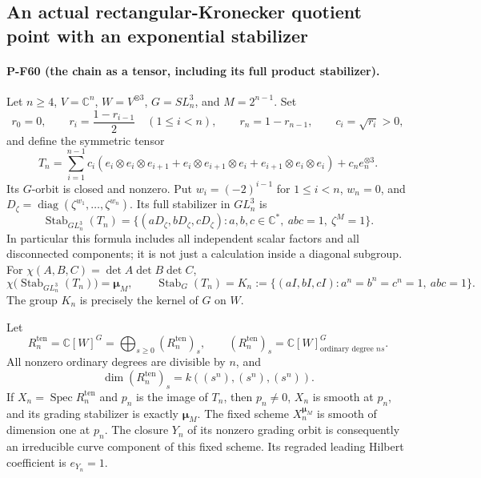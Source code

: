 \subsection{An actual rectangular-Kronecker quotient point with an exponential stabilizer}
\label{sec:tensor-chain-point}

\paragraph{P-F60 (the chain as a tensor, including its full product stabilizer).}
Let $n\ge4$, $V=\mathbb C^n$, $W=V^{\otimes3}$,
$G=SL_n^3$, and $M=2^{n-1}$.  Set
\[
 r_0=0,\qquad r_i=\frac{1-r_{i-1}}2\quad(1\le i<n),
 \qquad r_n=1-r_{n-1},\qquad c_i=\sqrt{r_i}>0,
                                                        \tag{P-F60a}
\]
and define the symmetric tensor
\[
 T_n=\sum_{i=1}^{n-1}c_i
   (e_i\otimes e_i\otimes e_{i+1}
    +e_i\otimes e_{i+1}\otimes e_i
    +e_{i+1}\otimes e_i\otimes e_i)
             +c_n e_n^{\otimes3}.                      \tag{P-F60b}
\]
Its $G$-orbit is closed and nonzero.  Put
$w_i=(-2)^{i-1}$ for $1\le i<n$, $w_n=0$, and
$D_\zeta=\operatorname{diag}(\zeta^{w_1},\ldots,\zeta^{w_n})$.
Its full stabilizer in $GL_n^3$ is
\[
 \operatorname{Stab}_{GL_n^3}(T_n)
   =\{(aD_\zeta,bD_\zeta,cD_\zeta):
          a,b,c\in\mathbb C^*,\ abc=1,\ \zeta^M=1\}.
                                                        \tag{P-F60c}
\]
In particular this formula includes all independent scalar
factors and all disconnected components; it is not just
a calculation inside a diagonal subgroup.  For
$\chi(A,B,C)=\det A\det B\det C$,
\[
 \chi\bigl(\operatorname{Stab}_{GL_n^3}(T_n)\bigr)
                         =\boldsymbol\mu_M,
 \qquad
 \operatorname{Stab}_{G}(T_n)
   =K_n:=\{(aI,bI,cI):a^n=b^n=c^n=1,\ abc=1\}.
                                                        \tag{P-F60d}
\]
The group $K_n$ is precisely the kernel of $G$ on $W$.

Let
\[
 R^{\mathrm{ten}}_n=\mathbb C[W]^G
       =\bigoplus_{s\ge0}(R^{\mathrm{ten}}_n)_s,
 \qquad
 (R^{\mathrm{ten}}_n)_s=\mathbb C[W]^G_{\text{ordinary degree }ns}.
                                                        \tag{P-F60e}
\]
All nonzero ordinary degrees are divisible by $n$, and
\[
 \dim(R^{\mathrm{ten}}_n)_s=k((s^n),(s^n),(s^n)).        \tag{P-F60f}
\]
If $X_n=\operatorname{Spec}R^{\mathrm{ten}}_n$ and
$p_n$ is the image of $T_n$, then $p_n\ne0$, $X_n$ is
smooth at $p_n$, and its grading stabilizer is exactly
$\boldsymbol\mu_M$.  The fixed scheme
$X_n^{\boldsymbol\mu_M}$ is smooth of dimension one at
$p_n$.  The closure $Y_n$ of its nonzero grading orbit
is consequently an irreducible curve component of this
fixed scheme.  Its regraded leading Hilbert coefficient
is $e_{Y_n}=1$.

